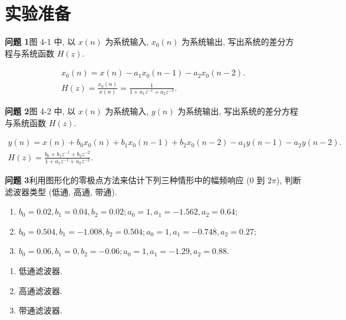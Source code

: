 \documentclass{dspreport}
\begin{document}
\maketitle

\section{实验准备}
\textbf{问题 1}\quad 图 4-1 中, 以 $x(n)$ 为系统输入, $x_0(n)$ 为系统输出, 写出系统的差分方程与系统函数 $H(z)$.

\begin{block}
\begin{gather*}
    x_0(n)=x(n)-a_1x_0(n-1)-a_2x_0(n-2). \\
    H(z)=\frac{x_0(n)}{x(n)}=\frac{1}{1+a_1z^{-1}+a_2z^{-2}}.
\end{gather*}
\end{block}

\textbf{问题 2}\quad 图 4-2 中, 以 $x(n)$ 为系统输入, $y(n)$ 为系统输出, 写出系统的差分方程与系统函数 $H(z)$.

\begin{block}
\begin{gather*}
    y(n)=x(n)+b_0x_0(n)+b_1x_0(n-1)+b_2x_0(n-2)-a_1y(n-1)-a_2y(n-2). \\
    H(z)=\frac{b_0+b_1z^{-1}+b_2z^{-2}}{1+a_1z^{-1}+a_2z^{-2}}.
\end{gather*}
\end{block}

\textbf{问题 3}\quad 利用图形化的零极点方法来估计下列三种情形中的幅频响应 (0 到 $2\pi$), 判断滤波器类型 (低通, 高通, 带通).
\begin{enumerate}[(1)]
    \item $b_0=0.02, b_1=0.04, b_2=0.02; a_0=1, a_1=-1.562, a_2=0.64$;
    \item $b_0=0.504, b_1=-1.008, b_2=0.504; a_0=1, a_1=-0.748, a_2=0.27$;
    \item $b_0=0.06, b_1=0, b_2=-0.06; a_0=1, a_1=-1.29, a_2=0.88$.
\end{enumerate}

\begin{block}
    \begin{enumerate}[(1)]
        \item 低通滤波器.
        \item 高通滤波器.
        \item 带通滤波器.
    \end{enumerate}
\end{block}
\end{document}
